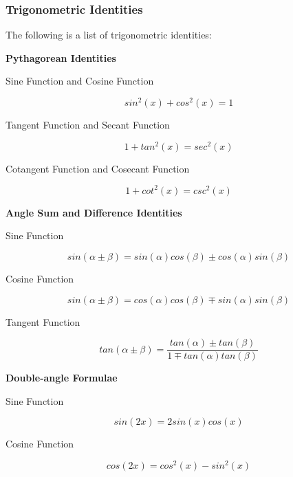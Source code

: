 \subsubsection{Trigonometric Identities}
\begin{thm}
  The following is a list of trigonometric identities:

  \begin{alist}
    \item \textbf{Pythagorean Identities}
    \begin{rlist}
      \item Sine Function and Cosine Function

      $$sin^{2}(x)+cos^{2}(x)=1$$

      \item Tangent Function and Secant Function

      $$1+tan^{2}(x)=sec^{2}(x)$$

      \item Cotangent Function and Cosecant Function

      $$1+cot^{2}(x)=csc^{2}(x)$$

    \end{rlist}
    \item \textbf{Angle Sum and Difference Identities}
    \begin{rlist}
      \item Sine Function

      $$sin(\alpha\pm \beta)=sin(\alpha)cos(\beta)\pm cos(\alpha)sin(\beta)$$

      \item Cosine Function

      $$sin(\alpha\pm \beta)=cos(\alpha)cos(\beta)\mp sin(\alpha)sin(\beta)$$

      \item Tangent Function

      $$tan(\alpha\pm \beta)=\frac{tan(\alpha)\pm tan(\beta)}{1\mp tan(\alpha)tan(\beta)}$$

    \end{rlist}
    \item \textbf{Double-angle Formulae}
    \begin{rlist}
      \item Sine Function

      $$sin(2x)=2sin(x)cos(x)$$

      \item Cosine Function

      $$cos(2x)=cos^{2}(x)-sin^{2}(x)$$


\end{rlist}
\end{alist}
\end{thm}
